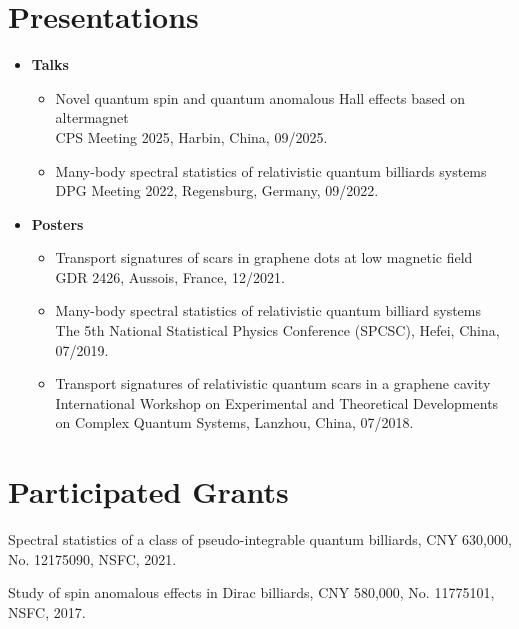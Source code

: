 \documentclass[letterpaper,11pt]{article}
\begin{document}
\section{Presentations}
  \begin{itemize}[font=$\bullet$]
  \item[]{\textbf{Talks}
    \begin{itemize}
    	\item {Novel quantum spin and quantum anomalous Hall effects based on altermagnet\\
    		CPS Meeting 2025, Harbin, China, 09/2025.}
        \item {Many-body spectral statistics of relativistic quantum billiards systems\\
                DPG Meeting 2022, Regensburg, Germany, 09/2022.}
    \end{itemize}}

    \item[]{\textbf{Posters}
    \begin{itemize}
        \item {Transport signatures of scars in graphene dots at low magnetic field\\
                GDR 2426, Aussois, France, 12/2021.}
        \item {Many-body spectral statistics of relativistic quantum billiard systems\\
                The 5th National Statistical Physics Conference (SPCSC), Hefei, China, 07/2019.}
        \item {Transport signatures of relativistic quantum scars in a graphene cavity\\
                International Workshop on Experimental and Theoretical Developments on Complex Quantum Systems, Lanzhou, China, 07/2018.}
    \end{itemize}}

\end{itemize}

\section{Participated Grants}
\begin{description}[font=$\bullet$]
\item {Spectral statistics of a class of pseudo-integrable quantum billiards, CNY 630,000, No. 12175090, NSFC, 2021.}
\item {Study of spin anomalous effects in Dirac billiards, CNY 580,000, No. 11775101, NSFC, 2017.}

\end{description}

\end{document}
